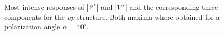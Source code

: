 \documentclass[prb,11pt,tightenlines,twocolumn,aps]{revtex4-1}
\begin{document}
\begin{figure}[t]
    \centering
    \\
    \caption{Most intense responses of $|\mathcal{V}^{\mathrm{x}}|$ and
    $|\mathcal{V}^{\mathrm{y}}|$ and the corresponding three components for the
    \emph{up} structure. Both maxima where obtained for a polarization
    angle $\alpha=40^{\circ}$. }
    \label{fig:up-vab-comp-rtp-1}
\end{figure}
\end{document}
